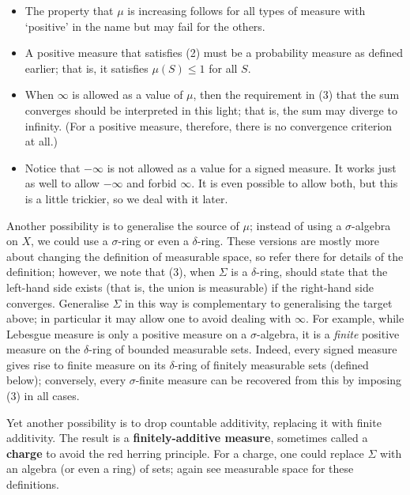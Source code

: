 \documentclass[preprint, 5p, 10pt]{elsarticle}
\theoremstyle{plain}
\begin{document}
\begin{itemize}%
\item The property that $\mu$ is increasing follows for all types of measure with `{}positive'{} in the name but may fail for the others.
\item A positive measure that satisfies (2) must be a probability measure as defined earlier; that is, it satisfies $\mu(S) \leq 1$ for all $S$.
\item When $\infty$ is allowed as a value of $\mu$, then the requirement in (3) that the sum converges should be interpreted in this light; that is, the sum may diverge to infinity. (For a positive measure, therefore, there is no convergence criterion at all.)
\item Notice that $-\infty$ is not allowed as a value for a signed measure. It works just as well to allow $-\infty$ and forbid $\infty$. It is even possible to allow both, but this is a little trickier, so we deal with it later.

\end{itemize}
Another possibility is to generalise the source of $\mu$; instead of using a $\sigma$-algebra on $X$, we could use a $\sigma$-ring or even a $\delta$-ring. These versions are mostly more about changing the definition of measurable space, so refer there for details of the definition; however, we note that (3), when $\Sigma$ is a $\delta$-ring, should state that the left-hand side exists (that is, the union is measurable) if the right-hand side converges. Generalise $\Sigma$ in this way is complementary to generalising the target above; in particular it may allow one to avoid dealing with $\infty$. For example, while Lebesgue measure is only a positive measure on a $\sigma$-algebra, it is a \emph{finite} positive measure on the $\delta$-ring of bounded measurable sets. Indeed, every signed measure gives rise to finite measure on its $\delta$-ring of finitely measurable sets (defined below); conversely, every $\sigma$-finite measure can be recovered from this by imposing (3) in all cases.

Yet another possibility is to drop countable additivity, replacing it with finite additivity. The result is a \textbf{finitely-additive measure}, sometimes called a \textbf{charge} to avoid the red herring principle. For a charge, one could replace $\Sigma$ with an algebra (or even a ring) of sets; again see measurable space for these definitions.
\end{document}
